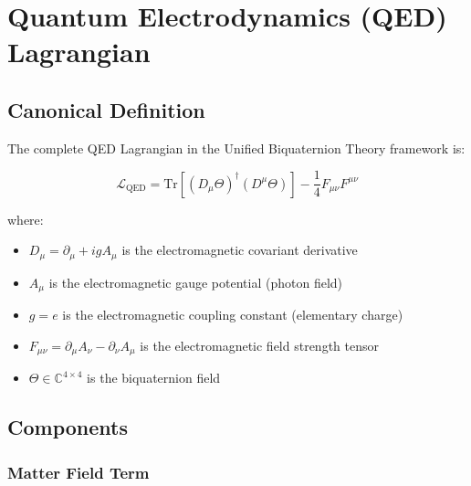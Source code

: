 

\section{Quantum Electrodynamics (QED) Lagrangian}
\label{sec:canonical:qed}

\subsection{Canonical Definition}

The complete QED Lagrangian in the Unified Biquaternion Theory framework is:

\begin{equation}
\label{eq:canonical:qed_lagrangian}
\boxed{\mathcal{L}_{\text{QED}} = \text{Tr}\left[(D_\mu\Theta)^\dagger (D^\mu\Theta)\right] - \frac{1}{4} F_{\mu\nu} F^{\mu\nu}}
\end{equation}

\noindent where:
\begin{itemize}
    \item $D_\mu = \partial_\mu + ig A_\mu$ is the electromagnetic covariant derivative
    \item $A_\mu$ is the electromagnetic gauge potential (photon field)
    \item $g = e$ is the electromagnetic coupling constant (elementary charge)
    \item $F_{\mu\nu} = \partial_\mu A_\nu - \partial_\nu A_\mu$ is the electromagnetic field strength tensor
    \item $\Theta \in \mathbb{C}^{4 \times 4}$ is the biquaternion field
\end{itemize}

\subsection{Components}

\subsubsection{Matter Field Term}

